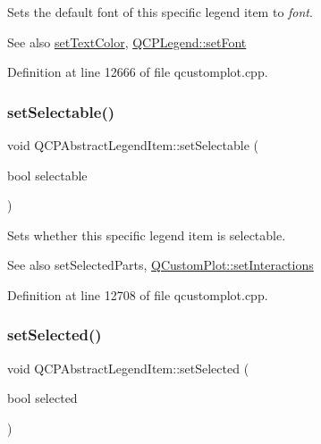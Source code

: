 Sets the default font of this specific legend item to {\itshape font}.

\begin{DoxySeeAlso}{See also}
\hyperlink{class_q_c_p_abstract_legend_item_a6ebace6aaffaedcdab2d74e88acc2d1e}{set\+Text\+Color}, \hyperlink{class_q_c_p_legend_aa4cda8499e3cb0f3be415edc02984c73}{Q\+C\+P\+Legend\+::set\+Font} 
\end{DoxySeeAlso}


Definition at line 12666 of file qcustomplot.\+cpp.

\mbox{\label{class_q_c_p_abstract_legend_item_a9913ef48730551b696e7f98a2391c599}} 
\subsubsection{\texorpdfstring{set\+Selectable()}{setSelectable()}}
{\footnotesize\ttfamily void Q\+C\+P\+Abstract\+Legend\+Item\+::set\+Selectable (\begin{DoxyParamCaption}\item[{bool}]{selectable }\end{DoxyParamCaption})}

Sets whether this specific legend item is selectable.

\begin{DoxySeeAlso}{See also}
set\+Selected\+Parts, \hyperlink{class_q_custom_plot_a5ee1e2f6ae27419deca53e75907c27e5}{Q\+Custom\+Plot\+::set\+Interactions} 
\end{DoxySeeAlso}


Definition at line 12708 of file qcustomplot.\+cpp.

\mbox{\label{class_q_c_p_abstract_legend_item_a6eed93b0ab99cb3eabb043fb08179c2b}} 
\subsubsection{\texorpdfstring{set\+Selected()}{setSelected()}}
{\footnotesize\ttfamily void Q\+C\+P\+Abstract\+Legend\+Item\+::set\+Selected (\begin{DoxyParamCaption}\item[{bool}]{selected }\end{DoxyParamCaption})}

